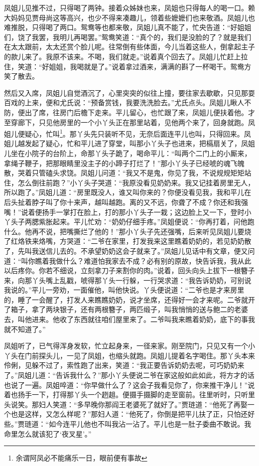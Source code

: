 \documentclass[12pt,oneside]{book}
\begin{document}
凤姐儿见推不过，只得喝了两钟。接着众姊妹也来，凤姐也只得每人的喝一口。赖大妈妈见贾母尚这等高兴，也少不得来凑趣儿，领着些嬷嬷们也来敬酒。凤姐儿也难推脱，只得喝了两口。鸳鸯等也都来敬，凤姐儿真不能了，忙央告道：“好姐姐们，饶了我罢，我明儿再喝罢。”鸳鸯笑道：“真个的，我们是没脸的了？就是我们在太太跟前，太太还赏个脸儿呢。往常倒有些体面，今儿当着这些人，倒拿起主子的款儿来了。我原不该来。不喝，我们就走。”说着真个回去了。凤姐儿忙赶上拉住，笑道：“好姐姐，我喝就是了。”说着拿过酒来，满满的斟了一杯喝干。鸳鸯方笑了散去。

然后又入席，凤姐儿自觉酒沉了，心里突突的似往上撞，要往家去歇歇，只见那耍百戏的上来，便和尤氏说：“预备赏钱，我要洗洗脸去。”尤氏点头。凤姐儿瞅人不防，便出了席，往房门后檐下走来。平儿留心，也忙跟了来，凤姐儿便扶着他。才至穿廊下，只见他房里的一个小丫头正在那里站着，见他两个来了，回身就跑。凤姐儿便疑心，忙叫\footnote{余谓阿凤必不能痛乐一日，眼前便有事故}。那丫头先只装听不见，无奈后面连平儿也叫，只得回来。凤姐儿越发起了疑心，忙和平儿进了穿堂，叫那小丫头子也进来，把槅扇关了，凤姐儿坐在小院子的台阶上，命那丫头子跪了，喝命平儿：“叫两个二门上的小厮来，拿绳子鞭子，把那眼睛里没主子的小蹄子打烂了！”那小丫头子已经唬的魂飞魄散，哭着只管磕头求饶。凤姐儿问道：“我又不是鬼，你见了我，不说规规矩矩站住，怎么倒往前跑？”小丫头子哭道：“我原没看见奶奶来。我又记挂着房里无人，所以跑了。”凤姐儿道：“房里既没人，谁又叫你来的？你便没看见我，我和平儿在后头扯着脖子叫了你十来声，越叫越跑。离的又不远，你聋了不成？你还和我强嘴！”说着便扬手一掌打在脸上，打的那小丫头子一栽；这边脸上又一下，登时小丫头子两腮紫胀起来。平儿忙劝：“奶奶仔细手疼。”凤姐便说：“你再打着，问他跑什么。他再不说，把嘴撕烂了他的！”那小丫头子先还强嘴，后来听见凤姐儿要烧了红烙铁来烙嘴，方哭道：“二爷在家里，打发我来这里瞧着奶奶的，若见奶奶散了，先叫我送信儿去的。不承望奶奶这会子就来了。”凤姐儿见话中有文章，便又问道：“叫你瞧着我做什么？难道怕我家去不成？必有别的原故，快告诉我，我从此以后疼你。你若不细说，立刻拿刀子来割你的肉。”说着，回头向头上拔下一根簪子来，向那丫头嘴上乱戳，唬得那丫头一行躲，一行哭求道：“我告诉奶奶，可别说我说的。”平儿一旁劝，一面催他，叫他快说。丫头便说道：“二爷也是才来房里的，睡了一会醒了，打发人来瞧瞧奶奶，说才坐席，还得好一会才来呢。二爷就开了箱子，拿了两块银子，还有两根簪子，两匹缎子，叫我悄悄的送与鲍二的老婆去，叫他进来。他收了东西就往咱们屋里来了。二爷叫我来瞧着奶奶，底下的事我就不知道了。”

凤姐听了，已气得浑身发软，忙立起身来，一径来家。刚至院门，只见又有一个小丫头在门前探头儿，一见了凤姐，也缩头就跑。凤姐儿提着名字喝住。那丫头本来伶俐，见躲不过了，索性跑了出来，笑道：“我正要告诉奶奶去呢，可巧奶奶来了。”凤姐儿道：“告诉我什么？”那小丫头便说二爷在家这般如此如此，将方才的话也说了一遍。凤姐啐道：“你早做什么了？这会子我看见你了，你来推干净儿！”说着也扬手一下，打得那丫头一个趔趄。便摄手摄脚的走至窗前。往里听时，只听里头说笑。那妇人笑道：“多早晚你那阎王老婆死了就好了。”贾琏道：“他死了再娶一个也是这样，又怎么样呢？”那妇人道：“他死了，你倒是把平儿扶了正，只怕还好些。”贾琏道：“如今连平儿他也不叫我沾一沾了。平儿也是一肚子委曲不敢说。我命里怎么就该犯了‘夜叉星’。”
\end{document}

